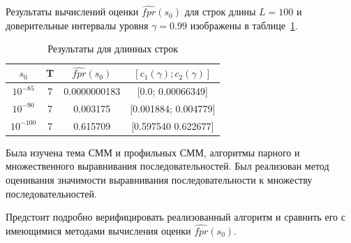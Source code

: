 \documentclass[specialist,
substylefile = spbu_report.rtx,
subf,href,colorlinks=true, 12pt]{disser}
\begin{document}
			 Результаты вычислений оценки $\widehat{fpr}(s_{0})$ для строк длины $L=100$ и доверительные интервалы уровня $\gamma = 0.99$ изображены в таблице~\ref{tb:2}.			 
			 
			 \begin{table}[H]
			 	\centering
			 	\caption{Результаты для длинных строк} \label{tb:2}
			 	\begin{tabular}{cccc}
			 		$s_{0}$&T&$\widehat{fpr}(s_{0})$&$[c_{1}(\gamma);c_{2}(\gamma)]$  \\ \hline
			 		$10^{-85}$&7&0.0000000183&[0.0; 0.00066349] \\
			 		$10^{-90}$&7&0.003175&[0.001884; 0.004779] \\ 
			 		$10^{-100}$&7&0.615709&[0.597540 0.622677] \\
			 	\end{tabular}
			 \end{table}
		
		\conclusion
			Была изучена тема СММ и профильных СММ, алгоритмы парного и множественного выравнивания последовательностей. Был реализован метод оценивания значимости выравнивания последовательности к множеству последовательностей.
			
			Предстоит подробно верифицировать реализованный алгоритм и сравнить его с имеющимися методами вычисления оценки $\widehat{fpr}(s_{0})$.

			\nocite{Stamp2021}
			\nocite{Jurafsky2021}
			\nocite{Rabiner1989}
			\nocite{Newberg2008}
			
			
						
\end{document}
